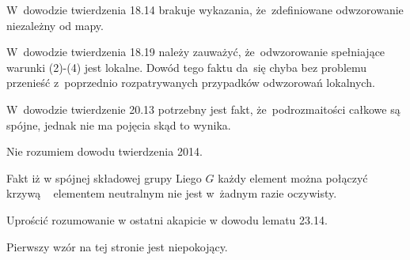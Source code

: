 \documentclass[a4paper,11pt]{article}
\numberwithin{equation}{section}
\begin{document}
\vspace{\spaceFour}





\noindent
{} W~dowodzie twierdzenia 18.14 brakuje wykazania,
że~zdefiniowane odwzorowanie niezależny od mapy.

\vspace{\spaceFour}





\noindent
{} W~dowodzie twierdzenia 18.19 należy zauważyć,
że~odwzorowanie spełniające warunki (2)-(4) jest lokalne. Dowód tego
faktu da~się chyba bez problemu przenieść z~poprzednio rozpatrywanych
przypadków odwzorowań lokalnych.

\vspace{\spaceFour}





\noindent
{} W~dowodzie twierdzenie 20.13 potrzebny jest fakt,
że~podrozmaitości całkowe są spójne, jednak nie ma pojęcia skąd to
wynika.

\vspace{\spaceFour}





\noindent
{} Nie rozumiem dowodu twierdzenia 2014.

\vspace{\spaceFour}





\noindent
{} Fakt iż w spójnej składowej grupy Liego $G$ każdy
element można połączyć krzywą ~ elementem neutralnym nie jest w~żadnym
razie oczywisty.

\vspace{\spaceFour}





\noindent
{} Uprościć rozumowanie w ostatni akapicie w dowodu
lematu 23.14.

\vspace{\spaceFour}





\noindent
{} Pierwszy wzór na tej stronie jest niepokojący.

\vspace{\spaceFour}
\end{document}

